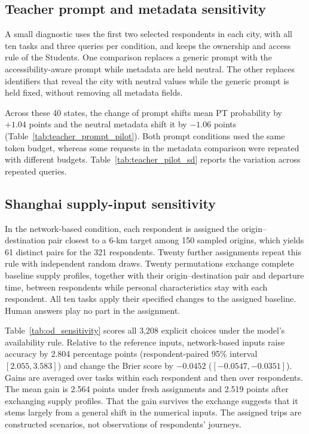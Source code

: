 \subsection{Teacher prompt and metadata sensitivity}
A small diagnostic uses the first two selected respondents in each city, with all ten tasks and three queries per condition, and keeps the ownership and access rule of the Students. One comparison replaces a generic prompt with the accessibility-aware prompt while metadata are held neutral. The other replaces identifiers that reveal the city with neutral values while the generic prompt is held fixed, without removing all metadata fields.

Across these 40 states, the change of prompt shifts mean PT probability by $+1.04$ points and the neutral metadata shift it by $-1.06$ points (Table~\ref{tab:teacher_prompt_pilot}). Both prompt conditions used the same token budget, whereas some requests in the metadata comparison were repeated with different budgets. Table~\ref{tab:teacher_pilot_sd} reports the variation across repeated queries.



\subsection{Shanghai supply-input sensitivity}
\label{sec:od_sensitivity}
In the network-based condition, each respondent is assigned the origin--destination pair closest to a 6-km target among 150 sampled origins, which yields 61 distinct pairs for the 321 respondents. Twenty further assignments repeat this rule with independent random draws. Twenty permutations exchange complete baseline supply profiles, together with their origin--destination pair and departure time, between respondents while personal characteristics stay with each respondent. All ten tasks apply their specified changes to the assigned baseline. Human answers play no part in the assignment.

Table~\ref{tab:od_sensitivity} scores all 3,208 explicit choices under the model's availability rule. Relative to the reference inputs, network-based inputs raise accuracy by 2.804 percentage points (respondent-paired 95\% interval $[2.055,3.583]$) and change the Brier score by $-0.0452$ ($[-0.0547,-0.0351]$). Gains are averaged over tasks within each respondent and then over respondents. The mean gain is 2.564 points under fresh assignments and 2.519 points after exchanging supply profiles. That the gain survives the exchange suggests that it stems largely from a general shift in the numerical inputs. The assigned trips are constructed scenarios, not observations of respondents' journeys.

\FloatBarrier
